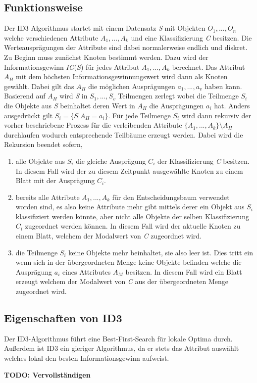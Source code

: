 \subsection{Funktionsweise}
Der ID3 Algorithmus startet mit einem Datensatz \textit{S} mit Objekten $O_{1},...,O_{n}$ welche verschiedenen Attribute $A_{1},...,A_{k}$ und eine Klassifizierung \textit{C} besitzen. \autocites{ImplementationID3}{QuinlanID3} Die Werteausprägungen der Attribute sind dabei normalerweise endlich und diskret. \autocite{ThailandID3}\\
Zu Beginn muss zunächst Knoten bestimmt werden. Dazu wird der Informationsgewinn \textit{IG}(\textit{S}) für jedes Attribut $A_{1},...,A_{k}$ berechnet. Das Attribut $A_{H}$ mit dem höchsten Informationsgewinnungswert wird dann als Knoten gewählt. Dabei gilt das $A_{H}$ die möglichen Ausprägungen $a_{1},...,a_{v}$ haben kann. Basierend auf $A_{H}$ wird \textit{S} in $S_{1},...,S_{v}$ Teilmengen zerlegt wobei die Teilmenge $S_{i}$ die Objekte aus \textit{S} beinhaltet deren Wert in $A_{H}$ die Ausprägungen $a_{i}$ hat. Anders ausgedrückt gilt $S_{i} = \{S\vert A_{H} = a_{i}\}$. Für jede Teilmenge $S_{i}$ wird dann rekursiv der vorher beschriebene Prozess für die verleibenden Attribute $\{A_{1},...,A_{k}\}\setminus A_{H}$ durchlaufen wodurch entsprechende Teilbäume erzeugt werden. \Autocite{QuinlanID3} Dabei wird die Rekursion beendet sofern,

\begin{enumerate}
    \item alle Objekte aus $S_{i}$ die gleiche Ausprägung $C_{i}$ der Klassifizierung \textit{C} besitzen. In diesem Fall wird der zu diesem Zeitpunkt ausgewählte Knoten zu einem Blatt mit der Ausprägung $C_{i}$. \autocites{QuinlanID3}{ID3algor15:online}
    \item bereits alle Attribute $A_{1},...,A_{k}$ für den Entscheidungsbaum verwendet worden sind, es also keine Attribute mehr gibt mittels derer ein Objekt aus $S_{i}$ klassifiziert werden könnte, aber nicht alle Objekte der selben Klassifizierung $C_{i}$ zugeordnet werden können. In diesem Fall wird der aktuelle Knoten zu einem Blatt, welchem der Modalwert von \textit{C} zugeordnet wird.\autocites{QuinlanID3}{ID3algor15:online}
    \item die Teilmenge $S_{i}$ keine Objekte mehr beinhaltet, sie also leer ist. Dies tritt ein wenn sich in der übergeordneten Menge keine Objekte befinden welche die Ausprägung $a_{i}$ eines Attributes $A_{M}$ besitzen. In diesem Fall wird ein Blatt erzeugt welchem der Modalwert von \textit{C} aus der übergeordneten Menge zugeordnet wird. \autocite{ID3algor15:online}
\end{enumerate}

\subsection{Eigenschaften von ID3}
\label{id3:eigenschaften}
Der ID3-Algorithmus führt eine Best-First-Search für lokale Optima durch. Außerdem ist ID3 ein gieriger Algorithmus, da er stets das Attribut auswählt welches lokal den besten Informationsgewinn aufweist.

\textbf{TODO: Vervollständigen}